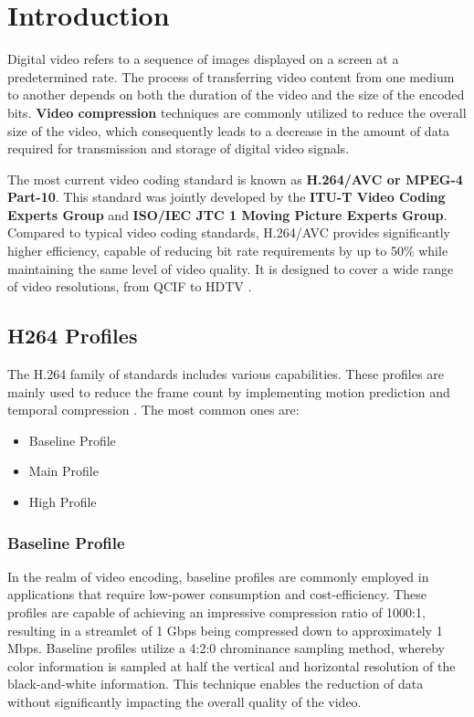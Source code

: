 
\chapter{Introduction} %
\label{Chapter1}

Digital video refers to a sequence of images displayed on a screen at a predetermined rate. The process of transferring video content from one medium to another depends on both the duration of the video and the size of the encoded bits. \textbf{Video compression} techniques are commonly utilized to reduce the overall size of the video, which consequently leads to a decrease in the amount of data required for transmission and storage of digital video signals.

The most current video coding standard is known as \textbf{H.264/AVC or MPEG-4 Part-10}. This standard was jointly developed by the \textbf{ITU-T Video Coding Experts Group} and \textbf{ISO/IEC JTC 1 Moving Picture Experts Group}. Compared to typical video coding standards, H.264/AVC provides significantly higher efficiency, capable of reducing bit rate requirements by up to 50$\%$ while maintaining the same level of video quality. It is designed to cover a wide range of video resolutions, from QCIF to HDTV \cite{lin2008parallel}.


\section{H264 Profiles}
The H.264 family of standards includes various capabilities. These profiles are mainly used to reduce the frame count by implementing motion prediction and temporal compression \cite{rgb-h264-profiles}. The most common ones are:

\begin{itemize}
	\item Baseline Profile
	\item Main Profile
	\item High Profile
\end{itemize}

\subsection{Baseline Profile}
In the realm of video encoding, baseline profiles are commonly employed in applications that require low-power consumption and cost-efficiency. These profiles are capable of achieving an impressive compression ratio of 1000:1, resulting in a streamlet of 1 Gbps being compressed down to approximately 1 Mbps. Baseline profiles utilize a 4:2:0 chrominance sampling method, whereby color information is sampled at half the vertical and horizontal resolution of the black-and-white information. This technique enables the reduction of data without significantly impacting the overall quality of the video.

